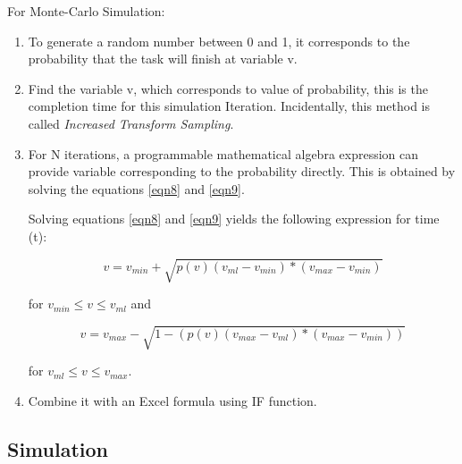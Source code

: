 For Monte-Carlo Simulation:

\begin{enumerate}
	\item To generate a random number between 0 and 1, it corresponds to the probability that the task will finish at variable {v}.
	\item Find the variable {v}, which corresponds to value of probability, this is the completion time for this simulation Iteration. Incidentally, this method is called \emph{Increased Transform Sampling}.
	\item For N iterations, a programmable mathematical algebra expression can provide variable corresponding to the probability directly. This is obtained by solving the equations \ref{eqn8} and  \ref{eqn9}.
	
	Solving equations \ref{eqn8} and  \ref{eqn9} yields the following expression for time (t):
	
	\begin{equation}
	v = v_{min} + \sqrt{ p(v) (v_{ml} - v_{min}) * (v_{max} - v_{min})}
	\label{eqn10}
	\end{equation}
	
	for $ v_{min} \leqslant v \leqslant v_{ml}$ and 
	
	\begin{equation}
	v = v_{max} - \sqrt{1 - (p(v) (v_{max} - v_{ml}) * (v_{max} - v_{min}))}
	\label{eqn11}
	\end{equation}
	
	for $ v_{ml} \leqslant v \leqslant v_{max}$. 
	
	\item Combine it with an Excel formula using IF function.
	
\end{enumerate}




\subsection{Simulation}

